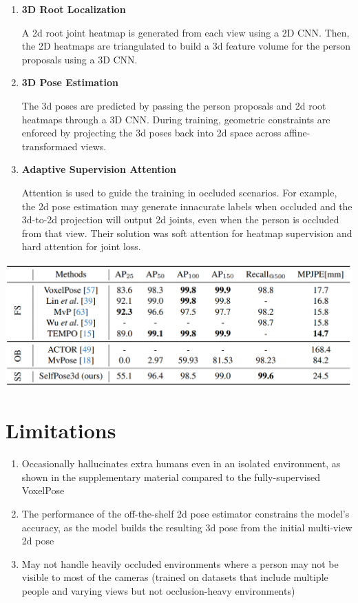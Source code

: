 \documentclass{article}
\begin{document}
\begin{enumerate}
    \item \textbf{3D Root Localization}
    
    A 2d root joint heatmap is generated from each view using a 2D CNN. Then, the 2D heatmaps are triangulated to build a 3d feature volume for the person proposals using a 3D CNN.

    \item \textbf{3D Pose Estimation}
    
    The 3d poses are predicted by passing the person proposals and 2d root heatmaps through a 3D CNN. During training, geometric constraints are enforced by projecting the 3d poses back into 2d space across affine-transformaed views.
    
    \item \textbf{Adaptive Supervision Attention}
    
    Attention is used to guide the training in occluded scenarios. For example, the 2d pose estimation may generate innacurate labels when occluded and the 3d-to-2d projection will output 2d joints, even when the person is occluded from that view. Their solution was soft attention for heatmap supervision and hard attention for joint loss.
\end{enumerate}

\begin{center}
    \includegraphics[scale=0.4]{selfpose3d-2.png}
\end{center}

\section*{Limitations}

\begin{enumerate}
    \item Occasionally hallucinates extra humans even in an isolated environment, as shown in the supplementary material compared to the fully-supervised VoxelPose
    \item The performance of the off-the-shelf 2d pose estimator constrains the model's accuracy, as the model builds the resulting 3d pose from the initial multi-view 2d pose
    \item May not handle heavily occluded environments where a person may not be visible to most of the cameras (trained on datasets that include multiple people and varying views but not occlusion-heavy environments)
\end{enumerate}
\end{document}
